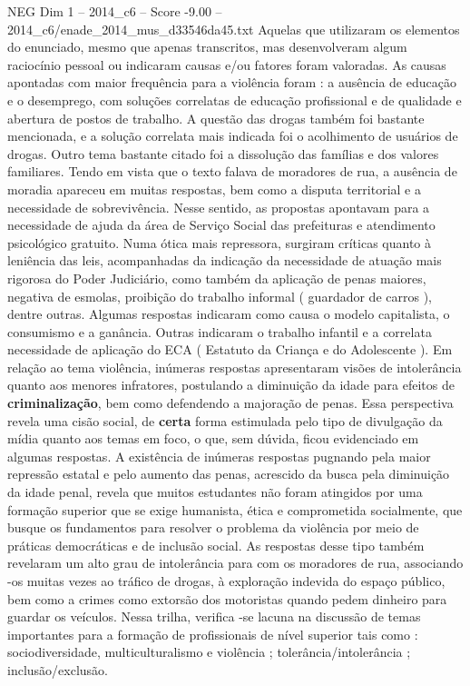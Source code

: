 \begin{textsample}{NEG Dim 1 – 2014\_c6 – Score -9.00 – 2014\_c6/enade\_2014\_mus\_d33546da45.txt}
Aquelas que utilizaram os elementos do enunciado, mesmo que apenas transcritos, mas desenvolveram algum raciocínio pessoal ou indicaram causas e/ou fatores foram valoradas.
As causas apontadas com maior frequência para a violência foram : a ausência de educação e o desemprego, com soluções correlatas de educação profissional e de qualidade e abertura de postos de trabalho.
A questão das drogas também foi bastante mencionada, e a solução correlata mais indicada foi o acolhimento de usuários de drogas.
Outro tema bastante citado foi a dissolução das famílias e dos valores familiares.
Tendo em vista que o texto falava de moradores de rua, a ausência de moradia apareceu em muitas respostas, bem como a disputa territorial e a necessidade de sobrevivência.
Nesse sentido, as propostas apontavam para a necessidade de ajuda da área de Serviço Social das prefeituras e atendimento psicológico gratuito.
Numa ótica mais repressora, surgiram críticas quanto à leniência das leis, acompanhadas da indicação da necessidade de atuação mais rigorosa do Poder Judiciário, como também da aplicação de penas maiores, negativa de esmolas, proibição do trabalho informal ( guardador de carros ), dentre outras.
Algumas respostas indicaram como causa o modelo capitalista, o consumismo e a ganância.
Outras indicaram o trabalho infantil e a correlata necessidade de aplicação do ECA ( Estatuto da Criança e do Adolescente ).
Em relação ao tema violência, inúmeras respostas apresentaram visões de intolerância quanto aos menores infratores, postulando a diminuição da idade para efeitos de \textbf{criminalização}, bem como defendendo a majoração de penas.
Essa perspectiva revela uma cisão social, de \textbf{certa} forma estimulada pelo tipo de divulgação da mídia quanto aos temas em foco, o que, sem dúvida, ficou evidenciado em algumas respostas.
A existência de inúmeras respostas pugnando pela maior repressão estatal e pelo aumento das penas, acrescido da busca pela diminuição da idade penal, revela que muitos estudantes não foram atingidos por uma formação superior que se exige humanista, ética e comprometida socialmente, que busque os fundamentos para resolver o problema da violência por meio de práticas democráticas e de inclusão social.
As respostas desse tipo também revelaram um alto grau de intolerância para com os moradores de rua, associando -os muitas vezes ao tráfico de drogas, à exploração indevida do espaço público, bem como a crimes como extorsão dos motoristas quando pedem dinheiro para guardar os veículos.
Nessa trilha, verifica -se lacuna na discussão de temas importantes para a formação de profissionais de nível superior tais como : sociodiversidade, multiculturalismo e violência ; tolerância/intolerância ; inclusão/exclusão.

\end{textsample}
